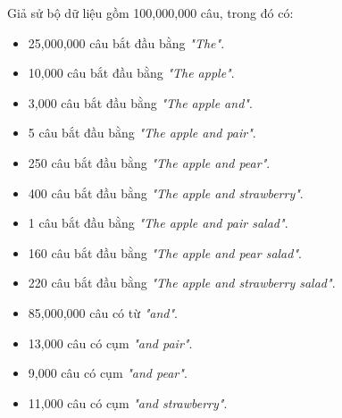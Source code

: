 Giả sử bộ dữ liệu gồm 100,000,000 câu, trong đó có:
\begin{itemize}
    \item 25,000,000 câu bắt đầu bằng \textit{"The"}.
    \item 10,000 câu bắt đầu bằng \textit{"The apple"}.
    \item 3,000 câu bắt đầu bằng \textit{"The apple and"}.
    \item 5 câu bắt đầu bằng \textit{"The apple and pair"}.
    \item 250 câu bắt đầu bằng \textit{"The apple and pear"}.
    \item 400 câu bắt đầu bằng \textit{"The apple and strawberry"}.
    \item 1 câu bắt đầu bằng \textit{"The apple and pair salad"}.
    \item 160 câu bắt đầu bằng \textit{"The apple and pear salad"}.
    \item 220 câu bắt đầu bằng \textit{"The apple and strawberry salad"}.
    \item 85,000,000 câu có từ \textit{"and"}.
    \item 13,000 câu có cụm \textit{"and pair"}.
    \item 9,000 câu có cụm \textit{"and pear"}.
    \item 11,000 câu có cụm \textit{"and strawberry"}.
\end{itemize}

